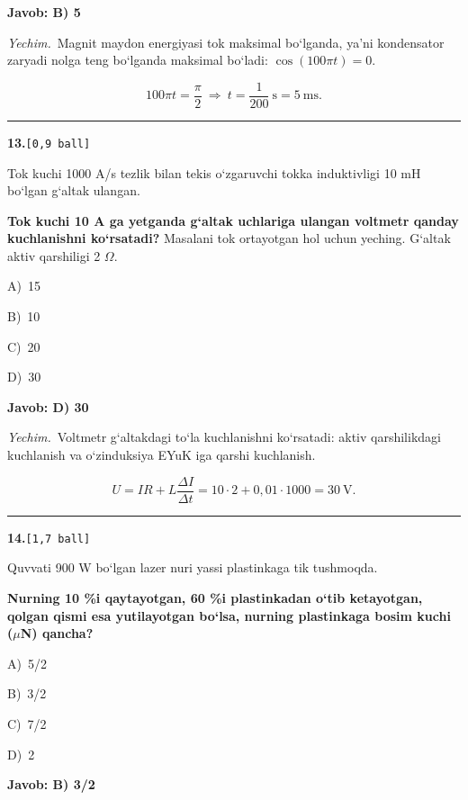 \documentclass[11pt,a4paper]{article}
\newcommand{\ball}[1]{\hfill\texttt{[#1 ball]}}
\newcommand{\qhead}[2]{\Needspace{10\baselineskip}\noindent\textbf{#1.}\ball{#2}\par\nopagebreak}
\newcommand{\opt}[2]{\hspace*{8mm}#1)\ #2\par}
\newenvironment{qbody}{\begin{list}{}{\leftmargin=8mm\rightmargin=0pt\topsep=0pt\itemsep=0pt\parsep=3pt}\item\relax}{\end{list}}
\begin{document}
\noindent\colorbox{gray!12}{\parbox{\dimexpr\linewidth-2\fboxsep}{\textbf{Javob: B) 5}}}\par\smallskip
\noindent\textit{Yechim.}\ Magnit maydon energiyasi tok maksimal bo‘lganda, ya’ni kondensator zaryadi nolga teng bo‘lganda maksimal bo‘ladi: $\cos(100\pi t)=0$.\par
\[100\pi t=\frac{\pi}{2}\ \Rightarrow\ t=\frac{1}{200}\ \text{s}=5\ \text{ms}.\]\par\medskip\hrule\medskip
\noindent\begin{minipage}{\linewidth}
\qhead{13}{0,9}
\begin{qbody}
Tok kuchi 1000 A/s tezlik bilan tekis o‘zgaruvchi tokka induktivligi 10 mH bo‘lgan g‘altak ulangan.\par
\textbf{Tok kuchi 10 A ga yetganda g‘altak uchlariga ulangan voltmetr qanday kuchlanishni ko‘rsatadi?} Masalani tok ortayotgan hol uchun yeching. G‘altak aktiv qarshiligi 2 $\Omega$.\par
\smallskip
\opt{A}{15}
\opt{B}{10}
\opt{C}{20}
\opt{D}{30}
\end{qbody}\end{minipage}\par\vspace{2pt}
\noindent\colorbox{gray!12}{\parbox{\dimexpr\linewidth-2\fboxsep}{\textbf{Javob: D) 30}}}\par\smallskip
\noindent\textit{Yechim.}\ Voltmetr g‘altakdagi to‘la kuchlanishni ko‘rsatadi: aktiv qarshilikdagi kuchlanish va o‘zinduksiya EYuK iga qarshi kuchlanish.\par
\[U=IR+L\frac{\Delta I}{\Delta t}=10\cdot2+0{,}01\cdot1000=30\ \text{V}.\]\par\medskip\hrule\medskip
\noindent\begin{minipage}{\linewidth}
\qhead{14}{1,7}
\begin{qbody}
Quvvati 900 W bo‘lgan lazer nuri yassi plastinkaga tik tushmoqda.\par
\textbf{Nurning 10 \%i qaytayotgan, 60 \%i plastinkadan o‘tib ketayotgan, qolgan qismi esa yutilayotgan bo‘lsa, nurning plastinkaga bosim kuchi ($\mu$N) qancha?}\par
\smallskip
\opt{A}{5/2}
\opt{B}{3/2}
\opt{C}{7/2}
\opt{D}{2}
\end{qbody}\end{minipage}\par\vspace{2pt}
\noindent\colorbox{gray!12}{\parbox{\dimexpr\linewidth-2\fboxsep}{\textbf{Javob: B) 3/2}}}\par\smallskip
\end{document}
